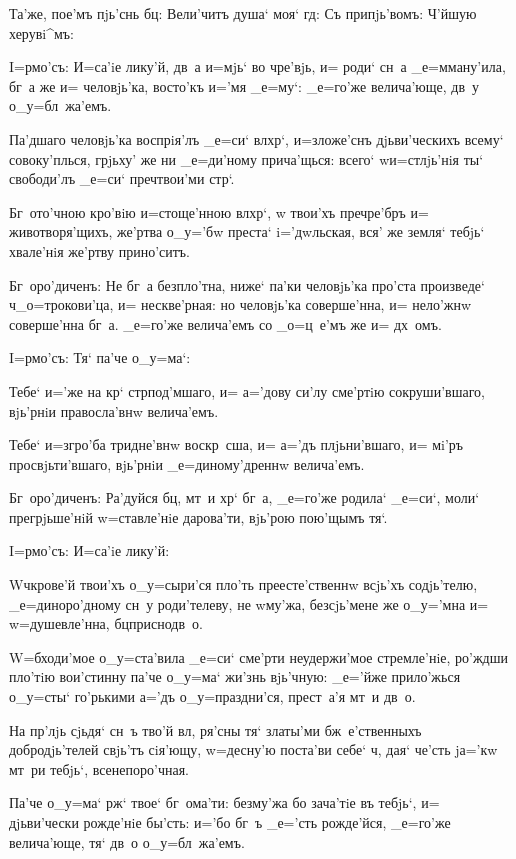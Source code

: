 Та'же, пое'мъ пjь'снь бц: Вели'читъ душа` моя` 
гд: Съ припjь'вомъ: Ч'йшую херувi^мъ:


I=рмо'съ: И=са'iе лику'й, дв~а и=мjь` во чре'вjь, и= 
роди` сн~а _е=мману'ила, бг~а же и= человjь'ка, восто'къ 
и='мя _е=му`: _е=го'же велича'юще, дв~у о_у=бл~жа'емъ.

Па'дшаго человjь'ка воспрiя'лъ _е=си` вл хр`, 
и=з\ъ ложе'снъ дjьви'ческихъ всему` совоку'плься, грjьху' 
же ни _е=ди'ному прича'щься: всего` w\т и=стлjь'нiя ты` 
свободи'лъ _е=си` преч твои'ми стр`.

Бг~ото'чною кро'вiю и=стоще'нною вл хр`, w\т 
твои'хъ преч ре'бръ и= животворя'щихъ, же'ртва 
о_у='бw преста` i='дwльская, вся' же земля` тебjь` 
хвале'нiя же'ртву прино'ситъ.

Бг~оро'диченъ: Не бг~а безпло'тна, ниже` па'ки 
человjь'ка про'ста произведе` ч _о=трокови'ца, и= 
нескве'рная: но человjь'ка соверше'нна, и= нело'жнw 
соверше'нна бг~а. _е=го'же велича'емъ со _о=ц~е'мъ же и= 
дх~омъ. 

 I=рмо'съ: Тя` па'че о_у=ма`:

Тебе` и='же на кр` стр под'мшаго, и= 
а='дову си'лу сме'ртiю сокруши'вшаго, вjь'рнiи 
правосла'внw велича'емъ.

Тебе` и=з\ъ гро'ба тридне'внw воскр~сша, и= а='дъ 
плjьни'вшаго, и= мi'ръ просвjьти'вшаго, вjь'рнiи 
_е=диному'дреннw велича'емъ.

Бг~оро'диченъ: Ра'дуйся бц, мт~и хр` бг~а, 
_е=го'же родила` _е=си`, моли` прегрjьше'нiй w=ставле'нiе 
дарова'ти, вjь'рою пою'щымъ тя`. 

 I=рмо'съ: И=са'iе лику'й:

W\т ч крове'й твои'хъ о_у=сыри'ся пло'ть 
преесте'ственнw всjь'хъ содjь'телю, _е=диноро'дному сн~у 
роди'телеву, не w\т му'жа, без\ъ сjь'мене же о_у='мна и= 
w=душевле'нна, бц приснодв~о.

W=бходи'мое о_у=ста'вила _е=си` сме'рти неудержи'мое 
стремле'нiе, ро'ждши пло'тiю вои'стинну па'че о_у=ма` 
жи'знь вjь'чную: _е='йже прило'жься о_у=сты` го'рькими 
а='дъ о_у=праздни'ся, прест~а'я мт~и дв~о.

На пр'лjь сjьдя` сн~ъ тво'й вл, ря'сны тя` 
златы'ми бж~е'ственныхъ добродjь'телей свjь'тъ сiя'ющу, 
w=десну'ю поста'ви себе` ч, дая` че'сть jа='кw мт~ри 
тебjь`, всенепоро'чная.

Па'че о_у=ма` рж` твое` бг~ома'ти: без\ъ му'жа бо 
зача'тiе въ тебjь`, и= дjьви'чески рожде'нiе бы'сть: 
и='бо бг~ъ _е='сть рожде'йся, _е=го'же велича'юще, тя` 
дв~о о_у=бл~жа'емъ.

